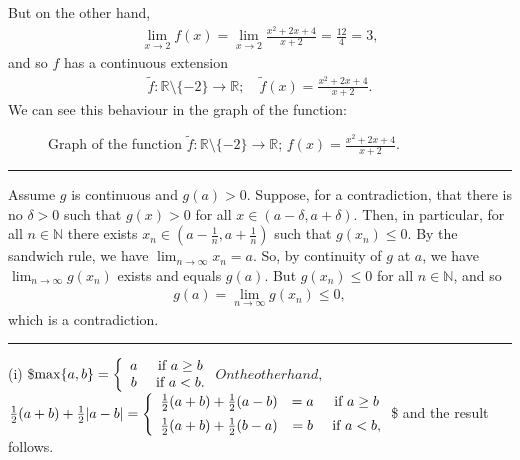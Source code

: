 \documentclass[letterpaper,10pt,english]{jupyterBook}
\let\sphinxpxdimen\pdfpxdimen\else\newdimen\sphinxpxdimen
\begin{document}
But on the other hand,
\begin{equation*}
\begin{split}
\lim_{x \rightarrow 2}f(x) = \lim_{x\rightarrow 2}  \frac{x^{2} + 2x + 4}{x + 2} = \frac{12}{4} = 3,
\end{split}
\end{equation*}
\sphinxAtStartPar
and so \(f\) has a continuous extension
\begin{equation*}
\begin{split}
\tilde{f}:\mathbb{R} \setminus \{-2\}\to\mathbb{R}; \hspace{1em} \tilde{f}(x) = \frac{x^2+2x+4}{x+2}.
\end{split}
\end{equation*}
\sphinxAtStartPar
We can see this behaviour in the graph of the function:

\begin{figure}[htbp]
\centering
\capstart

\noindent\sphinxincludegraphics[width=500\sphinxpxdimen]{{(x2+2x+4),(x+2)}.png}
\caption{Graph of the function \(\tilde{f}:\mathbb{R}\setminus\{-2\}\to\mathbb{R}\); \(f(x)=\frac{x^2+2x+4}{x+2}\).}\label{\detokenize{Solutions-full:q18}}\end{figure}


\bigskip\hrule\bigskip


\sphinxAtStartPar
{\hyperref[\detokenize{Problems:id19}]{}} Assume \(g\) is continuous and \(g(a) > 0\). Suppose, for a contradiction, that  there is no  \(\delta > 0\) such that \(g(x) > 0\)  for all \( x \in (a - \delta, a + \delta)\). Then, in particular, for all \(n\in\mathbb{N}\) there exists \(x_{n} \in \left(a - \frac{1}{n}, a + \frac{1}{n}\right)\) such that \(g(x_{n}) \leq 0\). By the sandwich rule, we have \(\lim_{n\rightarrow\infty} x_{n} = a\). So, by continuity of \(g\) at \(a\), we have \(\lim_{n\rightarrow\infty} g(x_{n})\) exists and equals \(g(a)\). But \(g(x_n)\leq 0\) for all \(n\in\mathbb{N}\), and so
\begin{equation*}
\begin{split}
g(a)=\lim_{n\rightarrow\infty} g(x_{n}) \leq 0,
\end{split}
\end{equation*}
\sphinxAtStartPar
which is a contradiction.


\bigskip\hrule\bigskip


\sphinxAtStartPar
{\hyperref[\detokenize{Problems:id20}]{}}
(i)
\$\(
\max\{a, b\} = \left\{\begin{array}{c c} a & ~\mbox{if}~a \geq b\\
b & ~\mbox{if}~a < b.\\ \end{array} \right.
\)\(
On the other hand,
\)\(
\frac{1}{2}( a+b) + \frac{1}{2}|a-b| = \left\{\begin{array}{c c c} \frac{1}{2}(a+b) + \frac{1}{2}(a- b) & = a & ~\mbox{if}~a \geq b\\[.5em]
\frac{1}{2}(a+b) + \frac{1}{2}(b- a) &=  b & ~\mbox{if}~a < b,\\ \end{array} \right.
\)\$
and the result follows.
\end{document}
